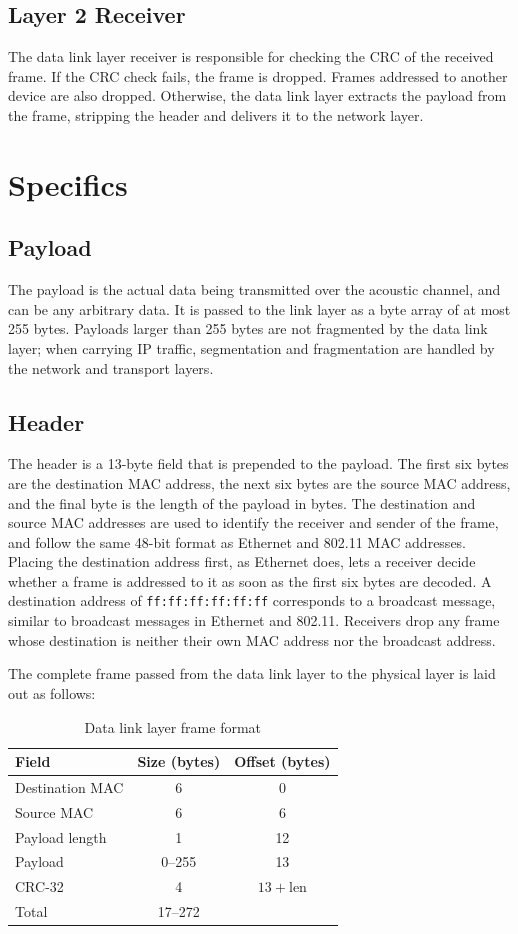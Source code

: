 \documentclass{article}
\begin{document}
\subsection{Layer 2 Receiver}
The data link layer receiver is responsible for checking the CRC of the received frame. If the CRC check fails, the frame is dropped. Frames addressed to another device are also dropped. Otherwise, the data link layer 
extracts the payload from the frame, stripping the header and delivers it to the network layer.

\section{Specifics}

\subsection{Payload}
The payload is the actual data being transmitted over the acoustic channel, and can be any arbitrary data. It is passed to the link layer as a byte array of at most 255 bytes. Payloads larger than 255 bytes are not fragmented by the data link layer; when carrying IP traffic, segmentation and fragmentation are handled by the network and transport layers.

\subsection{Header}
The header is a 13-byte field that is prepended to the payload. The first six bytes are the destination MAC address, the next six bytes are the source MAC address, and the final byte is the length of the payload in bytes. The destination and source MAC addresses are used to identify the receiver and sender of the frame, and follow the same 48-bit format as Ethernet and 802.11 MAC addresses. Placing the destination address first, as Ethernet does, lets a receiver decide whether a frame is addressed to it as soon as the first six bytes are decoded. A destination address of \texttt{ff:ff:ff:ff:ff:ff} corresponds to a broadcast message, similar to broadcast messages in Ethernet and 802.11. Receivers drop any frame whose destination is neither their own MAC address nor the broadcast address.

The complete frame passed from the data link layer to the physical layer is laid out as follows:

\begin{table}[H]
\centering
\begin{tabular}{lcc}
\toprule
Field & Size (bytes) & Offset (bytes) \\
\midrule
Destination MAC & 6 & 0 \\
Source MAC & 6 & 6 \\
Payload length & 1 & 12 \\
Payload & 0--255 & 13 \\
CRC-32 & 4 & $13 + \text{len}$ \\
\midrule
Total & 17--272 & \\
\bottomrule
\end{tabular}
\caption{Data link layer frame format}
\label{tab:frame-format}
\end{table}
\end{document}
